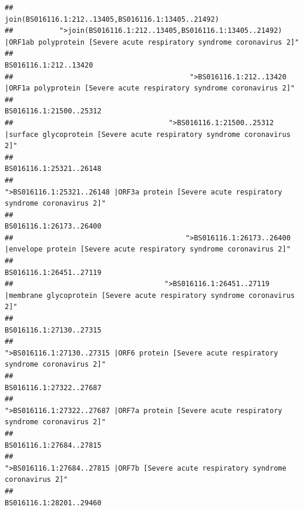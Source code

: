 \documentclass[
]{article}
\begin{document}
\begin{verbatim}
##                                                                                    join(BS016116.1:212..13405,BS016116.1:13405..21492) 
##           ">join(BS016116.1:212..13405,BS016116.1:13405..21492) |ORF1ab polyprotein [Severe acute respiratory syndrome coronavirus 2]" 
##                                                                                                                  BS016116.1:212..13420 
##                                          ">BS016116.1:212..13420 |ORF1a polyprotein [Severe acute respiratory syndrome coronavirus 2]" 
##                                                                                                                BS016116.1:21500..25312 
##                                     ">BS016116.1:21500..25312 |surface glycoprotein [Severe acute respiratory syndrome coronavirus 2]" 
##                                                                                                                BS016116.1:25321..26148 
##                                            ">BS016116.1:25321..26148 |ORF3a protein [Severe acute respiratory syndrome coronavirus 2]" 
##                                                                                                                BS016116.1:26173..26400 
##                                         ">BS016116.1:26173..26400 |envelope protein [Severe acute respiratory syndrome coronavirus 2]" 
##                                                                                                                BS016116.1:26451..27119 
##                                    ">BS016116.1:26451..27119 |membrane glycoprotein [Severe acute respiratory syndrome coronavirus 2]" 
##                                                                                                                BS016116.1:27130..27315 
##                                             ">BS016116.1:27130..27315 |ORF6 protein [Severe acute respiratory syndrome coronavirus 2]" 
##                                                                                                                BS016116.1:27322..27687 
##                                            ">BS016116.1:27322..27687 |ORF7a protein [Severe acute respiratory syndrome coronavirus 2]" 
##                                                                                                                BS016116.1:27684..27815 
##                                                    ">BS016116.1:27684..27815 |ORF7b [Severe acute respiratory syndrome coronavirus 2]" 
##                                                                                                                BS016116.1:28201..29460 

\end{verbatim}
\end{document}
